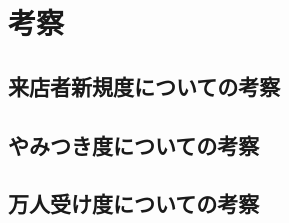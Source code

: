 \chapter{考察}


\label{chap:discussion}

\section{来店者新規度についての考察}
\section{やみつき度についての考察}
\section{万人受け度についての考察}
